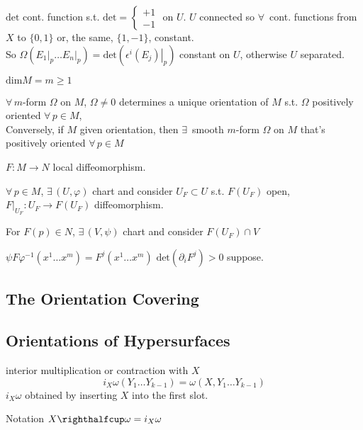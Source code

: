 $\text{det}$ cont. function s.t. $\text{det} = \begin{cases} +1 \\ -1 \end{cases}$ on $U$.  $U$ connected so $\forall \, $ cont. functions from $X$ to $\lbrace 0, 1 \rbrace$ or, the same, $\lbrace 1 , -1 \rbrace$, constant.  \\
So $\Omega( \left. E_1 \right|_p \dots \left. E_n \right|_p ) = \text{det}{ ( \left. \epsilon^i (E_j) \right|_p )}$ constant on $U$, otherwise $U$ separated.  

\begin{proposition}[13.4] 
$\text{dim}{M} = m \geq 1$ 

$\forall \, m$-form $\Omega$ on $M$, $\Omega\neq 0$ determines a unique orientation of $M$ s.t. $\Omega$ positively oriented $\forall \, p \in M$, \\
Conversely, if $M$ given orientation, then $\exists \, $ smooth $m$-form $\Omega$ on $M$ that's positively oriented $\forall \, p \in M$
\end{proposition}

$F:M \to N$ local diffeomorphism.  

$\forall \, p \in M$, $\exists \, (U, \varphi)$ chart and consider $U_F \subset U$ s.t. $F(U_F)$ open, $\left. F\right|_{U_F} : U_F \to F(U_F)$ diffeomorphism.  

For $F(p) \in N$, $\exists \, (V, \psi)$ chart and consider $F(U_F) \cap V$

$\psi F\varphi^{-1}(x^1 \dots x^m) = F^j(x^1 \dots x^m)$ \quad \quad $\text{det}{(\partial_i F^j)} >0$ suppose.  


\subsection*{The Orientation Covering}

\subsection*{Orientations of Hypersurfaces }

interior multiplication or contraction with $X$
\[
i_X\omega(Y_1 \dots Y_{k-1}) = \omega(X,Y_1 \dots Y_{k-1})
\]
$i_X \omega$ obtained by inserting $X$ into the first slot.

Notation $X \righthalfcup \omega = i_X \omega$









